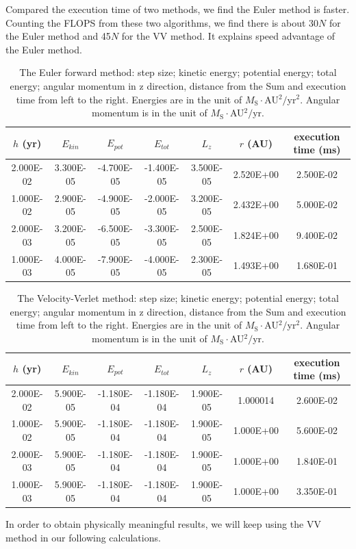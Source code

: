  Compared the execution time of two methods, we find the Euler method is faster. 
 Counting the FLOPS from these two algorithms, we find there is  about 30$N$ for the Euler method and 45$N$ for the VV method. It explains speed advantage of the Euler method.
 
\begin{table}[tb]
	\centering
	\caption{The Euler forward method: step size; kinetic energy; potential energy; total energy; angular momentum in z direction, distance from the Sum and execution time from left to the right.
	Energies are in the unit of $M_{\mathrm{S}}\cdot$AU$^2/$yr$^2$. Angular momentum is in the unit of $M_{\mathrm{S}}\cdot$AU$^2/$yr. }
	\label{tab::euler}
	\begin{tabular}{ccccccc}
	\hline
	\hline
$h$ (yr) & $E_{kin}$       & $E_{pot}$         & $E_{tot}$          & $L_z$        & $r$ (AU)        & execution time (ms)         \\
	\hline
2.000E-02 & 3.300E-05 & -4.700E-05 & -1.400E-05 & 3.500E-05 & 2.520E+00 & 2.500E-02 \\
1.000E-02 & 2.900E-05 & -4.900E-05 & -2.000E-05 & 3.200E-05 & 2.432E+00 & 5.000E-02 \\
2.000E-03 & 3.200E-05 & -6.500E-05 & -3.300E-05 & 2.500E-05 & 1.824E+00 & 9.400E-02 \\
1.000E-03 & 4.000E-05 & -7.900E-05 & -4.000E-05 & 2.300E-05 & 1.493E+00 & 1.680E-01\\
	\hline
	\hline
\end{tabular}
\end{table}

\begin{table}[tb]
	\centering
	\caption{The Velocity-Verlet method: step size; kinetic energy; potential energy; total energy; angular momentum in z direction, distance from the Sum and execution time from left to the right.
	Energies are in the unit of $M_{\mathrm{S}}\cdot$AU$^2/$yr$^2$. Angular momentum is in the unit of $M_{\mathrm{S}}\cdot$AU$^2/$yr. }
	\label{tab::verlet}
	\begin{tabular}{ccccccc}
	\hline
	\hline
$h$ (yr)      & $E_{kin}$        & $E_{pot}$         & $E_{tot}$          & $L_z$        & $r$ (AU)     & execution time (ms)         \\
	\hline
2.000E-02 & 5.900E-05 & -1.180E-04 & -1.180E-04 & 1.900E-05 & 1.000014 & 2.600E-02 \\
1.000E-02 & 5.900E-05 & -1.180E-04 & -1.180E-04 & 1.900E-05 & 1.000E+00 & 5.600E-02 \\
2.000E-03 & 5.900E-05 & -1.180E-04 & -1.180E-04 & 1.900E-05 & 1.000E+00 & 1.840E-01 \\
1.000E-03 & 5.900E-05 & -1.180E-04 & -1.180E-04 & 1.900E-05 & 1.000E+00 & 3.350E-01\\
	\hline
	\hline
\end{tabular}
\end{table}

In order to obtain physically meaningful results, we will keep using the VV method in our following calculations.
